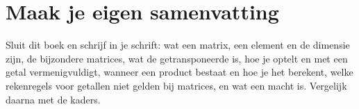 \begin{oefeningen}







\end{oefeningen}


\ifzelfstudie
\section*{Maak je eigen samenvatting}
Sluit dit boek en schrijf in je schrift: wat een matrix, een element en de dimensie zijn, de bijzondere matrices, wat de getransponeerde is, hoe je optelt en met een getal vermenigvuldigt, wanneer een product bestaat en hoe je het berekent, welke rekenregels voor getallen niet gelden bij matrices, en wat een macht is. Vergelijk daarna met de kaders.
\fi
